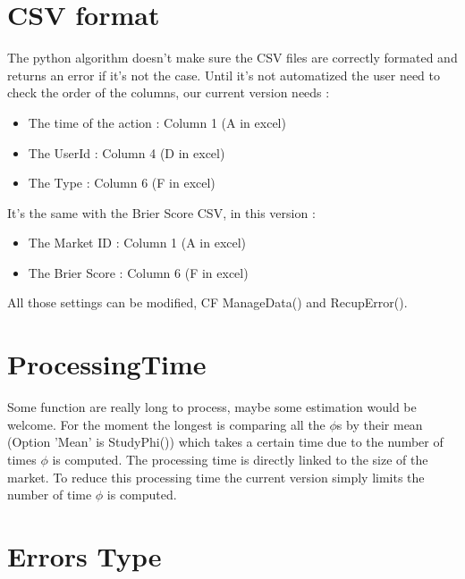 \documentclass{report}
\begin{document}
\section{CSV format}

The python algorithm doesn't make sure the CSV files are correctly formated and returns an error if it's not the case. Until it's not automatized the user need to check the order of the columns, our current version needs :

\begin{itemize}
\item The time of the action : Column 1 (A in excel)
\item The UserId : Column 4 (D in excel)
\item The Type : Column 6 (F in excel)
\end{itemize}

It's the same with the Brier Score CSV, in this version :
\begin{itemize}
\item The Market ID : Column 1 (A in excel)
\item The Brier Score : Column 6 (F in excel)
\end{itemize}

All those settings can be modified, CF ManageData() and RecupError().


\section{ProcessingTime}

Some function are really long to process, maybe some estimation would be welcome. For the moment the longest is comparing all the $\phi $s by their mean (Option 'Mean' is StudyPhi()) which takes a certain time due to the number of times $\phi $ is computed. The processing time is directly linked to the size of the market. To reduce this processing time the current version simply limits the number of time $\phi $ is computed.

\section{Errors Type}
\end{document}
